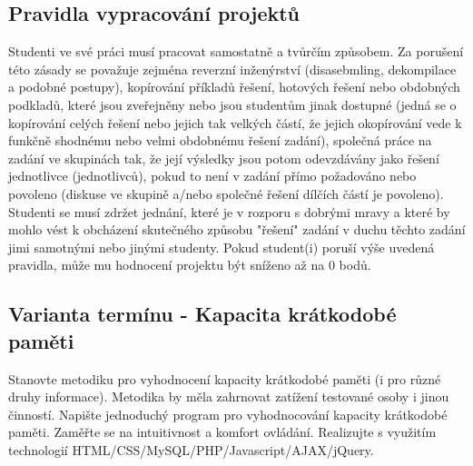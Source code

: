 \documentclass[11pt, a4paper, titlepage]{article}
\begin{document}

\subsection*{Pravidla vypracování projektů}

Studenti ve své práci musí pracovat samostatně a tvůrčím způsobem. Za porušení této zásady se považuje zejména reverzní inženýrství (disasebmling, dekompilace a podobné postupy), kopírování příkladů řešení, hotových řešení nebo obdobných podkladů, které jsou zveřejněny nebo jsou studentům jinak dostupné (jedná se o kopírování celých řešení nebo jejich tak velkých částí, že jejich okopírování vede k funkčně shodnému nebo velmi obdobnému řešení zadání), společná práce na zadání ve skupinách tak, že její výsledky jsou potom odevzdávány jako řešení jednotlivce (jednotlivců), pokud to není v zadání přímo požadováno nebo povoleno (diskuse ve skupině a/nebo společné řešení dílčích částí je povoleno). Studenti se musí zdržet jednání, které je v rozporu s dobrými mravy a které by mohlo vést k obcházení skutečného způsobu "řešení" zadání v duchu těchto zadání jimi samotnými nebo jinými studenty. Pokud student(i) poruší výše uvedená pravidla, může mu hodnocení projektu být sníženo až na 0 bodů.


\subsection*{Varianta termínu - Kapacita krátkodobé paměti}

Stanovte metodiku pro vyhodnocení kapacity krátkodobé paměti (i pro různé druhy informace). Metodika by měla zahrnovat zatížení testované osoby i jinou činností. Napište jednoduchý program pro vyhodnocování kapacity krátkodobé paměti. Zaměřte se na intuitivnost a komfort ovládání. Realizujte s využitím technologií HTML/CSS/MySQL/PHP/Javascript/AJAX/jQuery.

\end{document}
